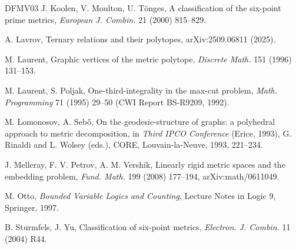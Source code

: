 \documentclass[11pt,a4paper]{article}
\theoremstyle{definition}
\theoremstyle{remark}
\begin{document}
\begin{thebibliography}{DFMV03}
 J. Koolen, V. Moulton, U. T\"onges, A classification of the six-point prime metrics,
\emph{European J. Combin.} 21 (2000) 815--829.

 A. Lavrov, Ternary relations and their polytopes, arXiv:2509.06811 (2025).

 M. Laurent, Graphic vertices of the metric polytope, \emph{Discrete Math.} 151 (1996) 131--153.

 M. Laurent, S. Poljak, One-third-integrality in the max-cut problem, \emph{Math. Programming}
71 (1995) 29--50 (CWI Report BS-R9209, 1992).

 M. Lomonosov, A. Seb\H{o}, On the geodesic-structure of graphs: a polyhedral approach to
metric decomposition, in \emph{Third IPCO Conference} (Erice, 1993), G. Rinaldi and L. Wolsey (eds.), CORE,
Louvain-la-Neuve, 1993, 221--234.

 J. Melleray, F. V. Petrov, A. M. Vershik, Linearly rigid metric spaces and the embedding
problem, \emph{Fund. Math.} 199 (2008) 177--194, arXiv:math/0611049.

 M. Otto, \emph{Bounded Variable Logics and Counting}, Lecture Notes in Logic 9, Springer,
1997.

 B. Sturmfels, J. Yu, Classification of six-point metrics, \emph{Electron. J. Combin.} 11
(2004) R44.

\end{thebibliography}
\end{document}
